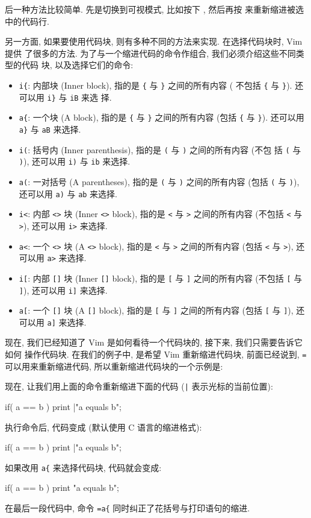 后一种方法比较简单. 先是切换到可视模式, 比如按下 , 然后再按
\key{=} 来重新缩进被选中的代码行.

另一方面, 如果要使用代码块, 则有多种不同的方法来实现. 在选择代码块时, Vim 提供
了很多的方法. 为了与一个缩进代码的命令作组合, 我们必须介绍这些不同类型的代码
块, 以及选择它们的命令:

\begin{itemize}
    \item \verb'i{': 内部块 (Inner block), 指的是 \verb'{' 与 \verb'}'
        之间的所有内容 (
        不包括 \verb'{' 与 \verb'}'). 还可以用 \verb'i}' 与 \texttt{iB} 来选
        择.
    \item \verb'a{': 一个块 (A block), 指的是 \verb'{' 与 \verb'}'
        之间的所有内容 (包括
        \verb'{' 与 \verb'}'). 还可以用 \verb'a}' 与 \verb'aB' 来选择.
    \item \verb'i(': 括号内 (Inner parenthesis), 指的是 \verb'(' 与 \verb')'
        之间的所有内容 (不包
        括 \verb'(' 与 \verb')'), 还可以用 \verb'i)' 与 \verb'ib' 来选择.
    \item \verb'a(': 一对括号 (A parentheses), 指的是 \verb'(' 与 \verb')'
        之间的所有内容 (包括 \verb'(' 与 \verb')'), 还可以用 \verb'a)' 与
        \verb'ab' 来选择.
    \item \verb'i<': 内部 \verb'<>' 块 (Inner \verb'<>' block), 指的是
        \verb'<' 与 \verb'>'
        之间的所有内容 (不包括 \verb'<' 与 \verb'>'), 还可以用 \verb'i>'
        来选择.
    \item \verb'a<': 一个 \verb'<>' 块 (A \verb'<>' block), 指的是
        \verb'<' 与 \verb'>'
        之间的所有内容 (包括 \verb'<' 与 \verb'>'), 还可以用 \verb'a>'
        来选择.
    \item \verb'i[': 内部 \verb'[]' 块 (Inner \verb'[]' block), 指的是
        \verb'[' 与 \verb']'
        之间的所有内容 (不包括 \verb'[' 与 \verb']'), 还可以用 \verb'i]'
        来选择.
    \item \verb'a[': 一个 \verb'[]' 块 (A \verb'[]' block), 指的是
        \verb'[' 与 \verb']'
        之间的所有内容 (包括 \verb'[' 与 \verb']'), 还可以用 \verb'a]'
        来选择.
\end{itemize}

现在, 我们已经知道了 Vim 是如何看待一个代码块的, 接下来, 我们只需要告诉它如何
操作代码块. 在我们的例子中, 是希望 Vim 重新缩进代码块, 前面已经说到,
\texttt{=} 可以用来重新缩进代码, 所以重新缩进代码块的一个示例是:
\begin{vimcode}
=i{
\end{vimcode}
现在, 让我们用上面的命令重新缩进下面的代码 (\verb'|' 表示光标的当前位置):
\begin{vimcode}
if( a == b )
  {
    print |"a equals b";
  }
\end{vimcode}
执行命令后, 代码变成 (默认使用 C 语言的缩进格式):
\begin{vimcode}
if( a == b )
  {
    print |"a equals b";
  }
\end{vimcode}
如果改用 \verb'a{' 来选择代码块, 代码就会变成:
\begin{vimcode}
if( a == b )
  {
    print "a equals b";
  }
\end{vimcode}
在最后一段代码中, 命令 \verb'=a{' 同时纠正了花括号与打印语句的缩进.


